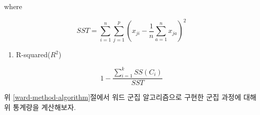 \documentclass[]{book}
\providecommand{\tightlist}{%
  \setlength{\itemsep}{0pt}\setlength{\parskip}{0pt}}
\begin{document}
where

\begin{equation*}
SST = \sum_{i = 1}^{n} \sum_{j = 1}^{p} \left( x_{ji} - \frac{1}{n} \sum_{a = 1}^{n} x_{ja} \right)^2
\end{equation*}

\begin{enumerate}
\def\labelenumi{\arabic{enumi}.}
\setcounter{enumi}{2}
\tightlist
\item
  R-squared(\(R^2\))
\end{enumerate}

\begin{equation*}
1 - \frac{\sum_{i = 1}^{k} SS(C_i)}{SST}
\end{equation*}

위 \ref{ward-method-algorithm}절에서 워드 군집 알고리즘으로 구현한 군집 과정에 대해 위 통계량을 계산해보자.
\end{document}
